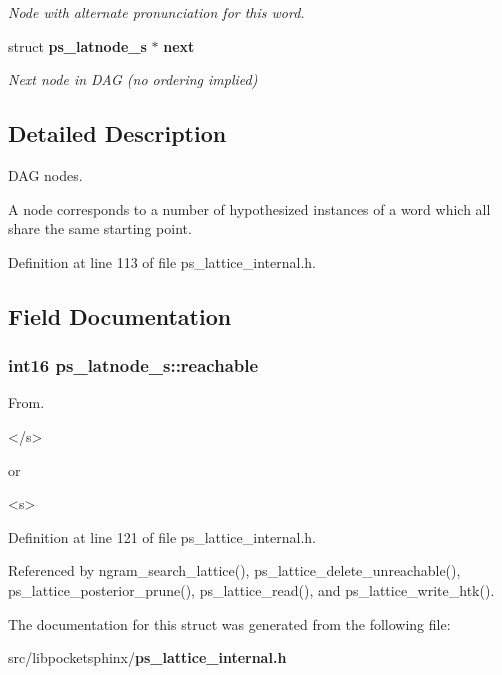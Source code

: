 \begin{DoxyCompactItemize}
\begin{DoxyCompactList}\small\item\em Node with alternate pronunciation for this word. \end{DoxyCompactList}\item 
struct {\bf ps\+\_\+latnode\+\_\+s} $\ast$ {\bf next}\label{structps__latnode__s_aca6f3d543a1712a1ca3bb8ec60f71c84}

\begin{DoxyCompactList}\small\item\em Next node in D\+A\+G (no ordering implied) \end{DoxyCompactList}\end{DoxyCompactItemize}


\subsection{Detailed Description}
D\+A\+G nodes. 

A node corresponds to a number of hypothesized instances of a word which all share the same starting point. 

Definition at line 113 of file ps\+\_\+lattice\+\_\+internal.\+h.



\subsection{Field Documentation}
\subsubsection[{reachable}]{\setlength{\rightskip}{0pt plus 5cm}int16 ps\+\_\+latnode\+\_\+s\+::reachable}\label{structps__latnode__s_af9c4c69f5f85bbc36818357a52432565}


From. 

\begin{DoxyVerb}</s> \end{DoxyVerb}
 or\begin{DoxyVerb}<s> \end{DoxyVerb}
 

Definition at line 121 of file ps\+\_\+lattice\+\_\+internal.\+h.



Referenced by ngram\+\_\+search\+\_\+lattice(), ps\+\_\+lattice\+\_\+delete\+\_\+unreachable(), ps\+\_\+lattice\+\_\+posterior\+\_\+prune(), ps\+\_\+lattice\+\_\+read(), and ps\+\_\+lattice\+\_\+write\+\_\+htk().



The documentation for this struct was generated from the following file\+:\begin{DoxyCompactItemize}
\item 
src/libpocketsphinx/{\bf ps\+\_\+lattice\+\_\+internal.\+h}\end{DoxyCompactItemize}
